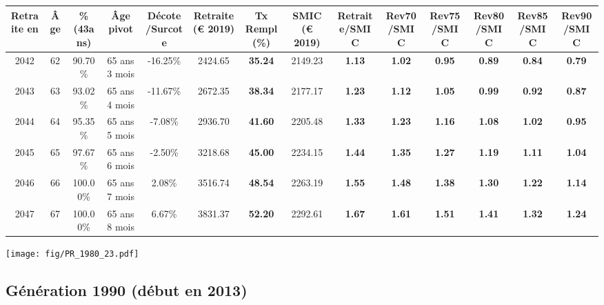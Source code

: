 \begin{adjustbox}{max width=\textwidth} 
\begin{tabular}[htb]{|c|c||c|c|c||c|c||c||c|c|c|c|c|c|} 
\hline 
 Retraite en &  Âge &  \%(43ans) &  Âge pivot &  Décote/Surcote &  Retraite (\euro{} 2019) &  Tx Rempl(\%) &  SMIC (\euro{} 2019) &  Retraite/SMIC &  Rev70/SMIC &  Rev75/SMIC &  Rev80/SMIC &  Rev85/SMIC &  Rev90/SMIC \\ 
\hline \hline 
 2042 &  62 &  90.70\% &  65 ans 3 mois &  -16.25\% &  2424.65 &  {\bf 35.24} &  2149.23 &  {\bf 1.13} &  {\bf 1.02} &  {\bf {\color{red} 0.95}} &  {\bf {\color{red} 0.89}} &  {\bf {\color{red} 0.84}} &  {\bf {\color{red} 0.79}} \\ 
\hline 
 2043 &  63 &  93.02\% &  65 ans 4 mois &  -11.67\% &  2672.35 &  {\bf 38.34} &  2177.17 &  {\bf 1.23} &  {\bf 1.12} &  {\bf 1.05} &  {\bf {\color{red} 0.99}} &  {\bf {\color{red} 0.92}} &  {\bf {\color{red} 0.87}} \\ 
\hline 
 2044 &  64 &  95.35\% &  65 ans 5 mois &  -7.08\% &  2936.70 &  {\bf 41.60} &  2205.48 &  {\bf 1.33} &  {\bf 1.23} &  {\bf 1.16} &  {\bf 1.08} &  {\bf 1.02} &  {\bf {\color{red} 0.95}} \\ 
\hline 
 2045 &  65 &  97.67\% &  65 ans 6 mois &  -2.50\% &  3218.68 &  {\bf 45.00} &  2234.15 &  {\bf 1.44} &  {\bf 1.35} &  {\bf 1.27} &  {\bf 1.19} &  {\bf 1.11} &  {\bf 1.04} \\ 
\hline 
 2046 &  66 &  100.00\% &  65 ans 7 mois &  2.08\% &  3516.74 &  {\bf 48.54} &  2263.19 &  {\bf 1.55} &  {\bf 1.48} &  {\bf 1.38} &  {\bf 1.30} &  {\bf 1.22} &  {\bf 1.14} \\ 
\hline 
 2047 &  67 &  100.00\% &  65 ans 8 mois &  6.67\% &  3831.37 &  {\bf 52.20} &  2292.61 &  {\bf 1.67} &  {\bf 1.61} &  {\bf 1.51} &  {\bf 1.41} &  {\bf 1.32} &  {\bf 1.24} \\ 
\hline 
\hline 
\end{tabular} 
\end{adjustbox} 
 
 \vspace{0.1cm} 

 \begin{center}\texttt{[image: fig/PR\_1980\_23.pdf]}\end{center} \label{fig/PR_1980_23.pdf} 

\newpage 
 
\subsection{Génération 1990 (début en 2013)} 

